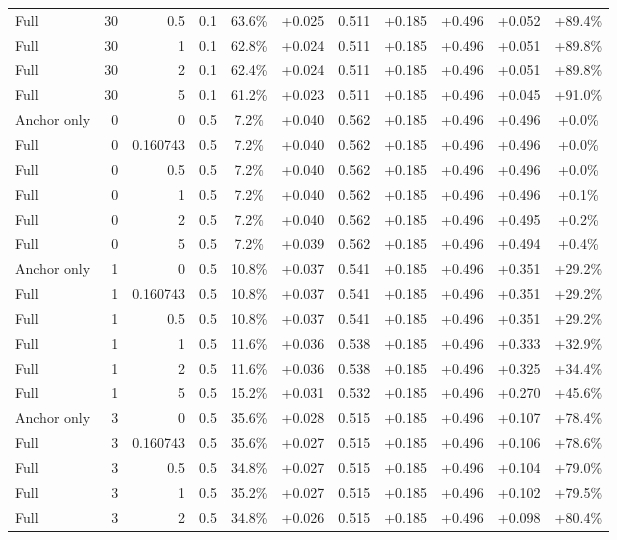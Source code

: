 \begin{table}[htbp]
\begin{tabular}{lrrrccccccc}
Full & 30 & 0.5 & 0.1 & 63.6\% & +0.025 & 0.511 & +0.185 & +0.496 & +0.052 & +89.4\% \\
Full & 30 & 1 & 0.1 & 62.8\% & +0.024 & 0.511 & +0.185 & +0.496 & +0.051 & +89.8\% \\
Full & 30 & 2 & 0.1 & 62.4\% & +0.024 & 0.511 & +0.185 & +0.496 & +0.051 & +89.8\% \\
Full & 30 & 5 & 0.1 & 61.2\% & +0.023 & 0.511 & +0.185 & +0.496 & +0.045 & +91.0\% \\
Anchor only & 0 & 0 & 0.5 & 7.2\% & +0.040 & 0.562 & +0.185 & +0.496 & +0.496 & +0.0\% \\
Full & 0 & 0.160743 & 0.5 & 7.2\% & +0.040 & 0.562 & +0.185 & +0.496 & +0.496 & +0.0\% \\
Full & 0 & 0.5 & 0.5 & 7.2\% & +0.040 & 0.562 & +0.185 & +0.496 & +0.496 & +0.0\% \\
Full & 0 & 1 & 0.5 & 7.2\% & +0.040 & 0.562 & +0.185 & +0.496 & +0.496 & +0.1\% \\
Full & 0 & 2 & 0.5 & 7.2\% & +0.040 & 0.562 & +0.185 & +0.496 & +0.495 & +0.2\% \\
Full & 0 & 5 & 0.5 & 7.2\% & +0.039 & 0.562 & +0.185 & +0.496 & +0.494 & +0.4\% \\
Anchor only & 1 & 0 & 0.5 & 10.8\% & +0.037 & 0.541 & +0.185 & +0.496 & +0.351 & +29.2\% \\
Full & 1 & 0.160743 & 0.5 & 10.8\% & +0.037 & 0.541 & +0.185 & +0.496 & +0.351 & +29.2\% \\
Full & 1 & 0.5 & 0.5 & 10.8\% & +0.037 & 0.541 & +0.185 & +0.496 & +0.351 & +29.2\% \\
Full & 1 & 1 & 0.5 & 11.6\% & +0.036 & 0.538 & +0.185 & +0.496 & +0.333 & +32.9\% \\
Full & 1 & 2 & 0.5 & 11.6\% & +0.036 & 0.538 & +0.185 & +0.496 & +0.325 & +34.4\% \\
Full & 1 & 5 & 0.5 & 15.2\% & +0.031 & 0.532 & +0.185 & +0.496 & +0.270 & +45.6\% \\
Anchor only & 3 & 0 & 0.5 & 35.6\% & +0.028 & 0.515 & +0.185 & +0.496 & +0.107 & +78.4\% \\
Full & 3 & 0.160743 & 0.5 & 35.6\% & +0.027 & 0.515 & +0.185 & +0.496 & +0.106 & +78.6\% \\
Full & 3 & 0.5 & 0.5 & 34.8\% & +0.027 & 0.515 & +0.185 & +0.496 & +0.104 & +79.0\% \\
Full & 3 & 1 & 0.5 & 35.2\% & +0.027 & 0.515 & +0.185 & +0.496 & +0.102 & +79.5\% \\
Full & 3 & 2 & 0.5 & 34.8\% & +0.026 & 0.515 & +0.185 & +0.496 & +0.098 & +80.4\% \\

\end{tabular}
\end{table}
